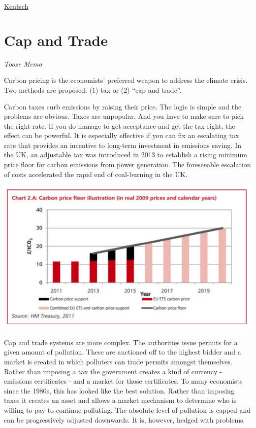 \documentclass[
]{book}
\begin{document}
\href{https://www.c2g2.net/stratospheric-aerosol-injection-could-be-a-painkiller-but-not-a-cure-and-more-research-is-needed/}{Keutsch}

\hypertarget{cap-and-trade}{%
\chapter{Cap and Trade}\label{cap-and-trade}}

\emph{Tooze Memo}

Carbon pricing is the economists' preferred weapon to address the climate crisis. Two methods are proposed: (1) tax or (2) ``cap and trade''.

Carbon taxes curb emissions by raising their price. The logic is simple and the problems are obvious. Taxes are unpopular. And you have to make sure to pick the right rate. If you do manage to get acceptance and get the tax right, the effect can be powerful. It is especially effective if you can fix an escalating tax rate that provides an incentive to long-term investment in emissions saving. In the UK, an adjustable tax was introduced in 2013 to establish a rising minimum price floor for carbon emissions from power generation. The foreseeable escalation of costs accelerated the rapid end of coal-burning in the UK.

\includegraphics{fig/cap_and_trade_UK.png}

Cap and trade systems are more complex. The authorities issue permits for a given amount of pollution. These are auctioned off to the highest bidder and a market is created in which polluters can trade permits amongst themselves. Rather than imposing a tax the government creates a kind of currency - emissions certificates - and a market for those certificates. To many economists since the 1980s, this has looked like the best solution. Rather than imposing taxes it creates an asset and allows a market mechanism to determine who is willing to pay to continue polluting. The absolute level of pollution is capped and can be progressively adjusted downwards. It is, however, hedged with problems.
\end{document}
